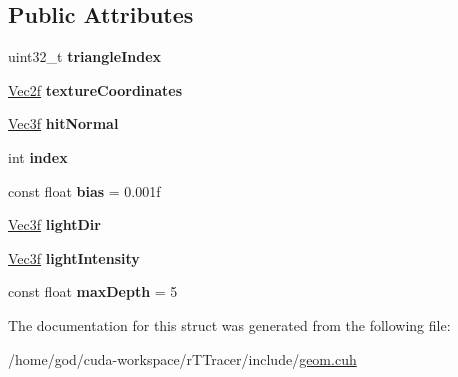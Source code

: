 \subsection*{Public Attributes}
\begin{DoxyCompactItemize}
\item 
uint32\+\_\+t {\bfseries triangle\+Index}\hypertarget{struct_g_p_u_1_1_rendering_context_a3f3cbd7668f1e3284e6d81a6ff45af15}{}\label{struct_g_p_u_1_1_rendering_context_a3f3cbd7668f1e3284e6d81a6ff45af15}

\item 
\hyperlink{class_vec2}{Vec2f} {\bfseries texture\+Coordinates}\hypertarget{struct_g_p_u_1_1_rendering_context_adb0db7d6cac7e75aac9022bc1a6e5d4c}{}\label{struct_g_p_u_1_1_rendering_context_adb0db7d6cac7e75aac9022bc1a6e5d4c}

\item 
\hyperlink{class_vec3}{Vec3f} {\bfseries hit\+Normal}\hypertarget{struct_g_p_u_1_1_rendering_context_ab52a46edf31d08fbb3e38b7e4973440e}{}\label{struct_g_p_u_1_1_rendering_context_ab52a46edf31d08fbb3e38b7e4973440e}

\item 
int {\bfseries index}\hypertarget{struct_g_p_u_1_1_rendering_context_aac9e3cc37208b4379d493b2ba669e33c}{}\label{struct_g_p_u_1_1_rendering_context_aac9e3cc37208b4379d493b2ba669e33c}

\item 
const float {\bfseries bias} = 0.\+001f\hypertarget{struct_g_p_u_1_1_rendering_context_a942e8aeb662e5b24f782c38fb172d99e}{}\label{struct_g_p_u_1_1_rendering_context_a942e8aeb662e5b24f782c38fb172d99e}

\item 
\hyperlink{class_vec3}{Vec3f} {\bfseries light\+Dir}\hypertarget{struct_g_p_u_1_1_rendering_context_a205c2dfe9842e0aea733e4bbb1da4e52}{}\label{struct_g_p_u_1_1_rendering_context_a205c2dfe9842e0aea733e4bbb1da4e52}

\item 
\hyperlink{class_vec3}{Vec3f} {\bfseries light\+Intensity}\hypertarget{struct_g_p_u_1_1_rendering_context_aa05e2be366dd8c157851ce8cbe00ed56}{}\label{struct_g_p_u_1_1_rendering_context_aa05e2be366dd8c157851ce8cbe00ed56}

\item 
const float {\bfseries max\+Depth} = 5\hypertarget{struct_g_p_u_1_1_rendering_context_a4b82358bf664122a391de3ff07519829}{}\label{struct_g_p_u_1_1_rendering_context_a4b82358bf664122a391de3ff07519829}

\end{DoxyCompactItemize}


The documentation for this struct was generated from the following file\+:\begin{DoxyCompactItemize}
\item 
/home/god/cuda-\/workspace/r\+T\+Tracer/include/\hyperlink{geom_8cuh}{geom.\+cuh}\end{DoxyCompactItemize}
